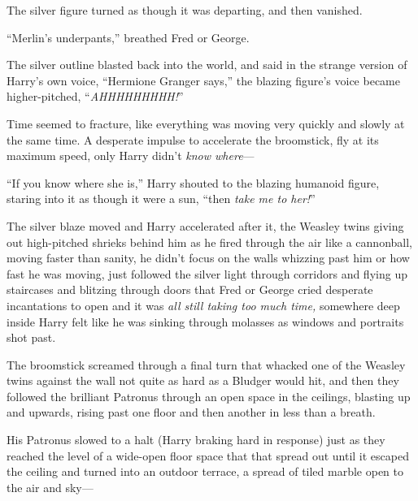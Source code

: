 The silver figure turned as though it was departing, and then vanished.

“Merlin’s underpants,” breathed Fred or George.

The silver outline blasted back into the world, and said in the strange
version of Harry’s own voice, “Hermione Granger says,” the blazing figure’s
voice became higher-pitched, “\emph{AHHHHHHHHH!}”

Time seemed to fracture, like everything was moving very quickly and slowly at
the same time. A desperate impulse to accelerate the broomstick, fly at its
maximum speed, only Harry didn’t \emph{know where}—

“If you know where she is,” Harry shouted to the blazing humanoid figure,
staring into it as though it were a sun, “then \emph{take me to her!}”

The silver blaze moved and Harry accelerated after it, the Weasley twins giving
out high-pitched shrieks behind him as he fired through the air like a
cannonball, moving faster than sanity, he didn’t focus on the walls whizzing
past him or how fast he was moving, just followed the silver light through
corridors and flying up staircases and blitzing through doors that Fred or
George cried desperate incantations to open and it was \emph{all still taking
too much time,} somewhere deep inside Harry felt like he was sinking through
molasses as windows and portraits shot past.

The broomstick screamed through a final turn that whacked one of the Weasley
twins against the wall not quite as hard as a Bludger would hit, and then they
followed the brilliant Patronus through an open space in the ceilings, blasting
up and upwards, rising past one floor and then another in less than a breath.

His Patronus slowed to a halt (Harry braking hard in response) just as they
reached the level of a wide-open floor space that that spread out until it
escaped the ceiling and turned into an outdoor terrace, a spread of tiled
marble open to the air and sky—
